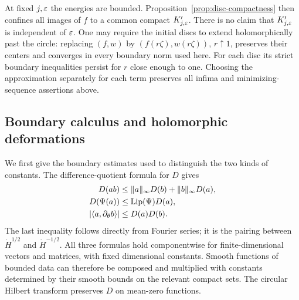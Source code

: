 At fixed $j,\varepsilon$ the energies are bounded.  Proposition~\ref{prop:disc-compactness}
then confines all images of $f$ to a common compact $K_{j,\varepsilon}'$.
There is no claim that $K_{j,\varepsilon}'$ is independent of $\varepsilon$.
One may require the initial discs to extend holomorphically past the
circle: replacing $(f,w)$ by $(f(r\zeta),w(r\zeta))$, $r\uparrow1$,
preserves their centers and converges in every boundary norm used here.
For each disc its strict boundary inequalities persist for $r$ close
enough to one.  Choosing the approximation separately for each term
preserves all infima and minimizing-sequence assertions above.

\subsection{Boundary calculus and holomorphic deformations}

We first give the boundary estimates used to distinguish the two kinds
of constants.  The difference-quotient formula for $D$ gives
\begin{equation}
 \begin{split}
 D(ab)&\le\|a\|_\infty D(b)+\|b\|_\infty D(a),\\
 D(\Psi(a))&\le\operatorname{Lip}(\Psi)D(a),\\
 |\langle a,\partial_\theta b\rangle|&\le D(a)D(b).
 \end{split}
 \label{var:boundary-calculus}
\end{equation}
The last inequality follows directly from Fourier series; it is the
pairing between $\dot H^{1/2}$ and $\dot H^{-1/2}$.  All three formulas
hold componentwise for finite-dimensional vectors and matrices, with
fixed dimensional constants.  Smooth functions of bounded data can
therefore be composed and multiplied with constants determined by their
smooth bounds on the relevant compact sets.  The circular Hilbert
transform preserves $D$ on mean-zero functions.

